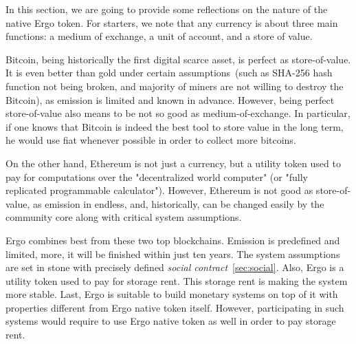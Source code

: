 


 In this section, we are going to provide some reflections on the nature of the native Ergo token. For starters, we note that
 any currency is about three main functions: a medium of exchange, a unit of account, and a store of value.

 Bitcoin, being historically the first digital scarce asset, is perfect as store-of-value. It is even better than
 gold under certain assumptions~(such as SHA-256 hash function not being broken, and majority of miners are not willing
 to destroy the Bitcoin), as emission is limited and known in advance. However, being perfect store-of-value also means
 to be not so good as medium-of-exchange. In particular, if one knows that Bitcoin is indeed the best tool to store
 value in the long term, he would use fiat whenever possible in order to collect more bitcoins.

 On the other hand, Ethereum is not just a currency, but a utility token used to pay for computations over the
 "decentralized world computer" (or "fully replicated programmable calculator"). However, Ethereum is not good as
 store-of-value, as emission in endless, and, historically, can be changed easily by the community core along with
 critical system assumptions.

 Ergo combines best from these two top blockchains. Emission is predefined and limited, more, it will be finished within
 just ten years. The system assumptions are set in stone with precisely defined {\em social contract}~\ref{sec:social}. Also,
 Ergo is a utility token used to pay for storage rent. This storage rent is making the system more stable. Last, Ergo is
 suitable to build monetary systems on top of it with properties different from Ergo native token itself. However,
 participating in such systems would require to use Ergo native token as well in order to pay storage rent.
